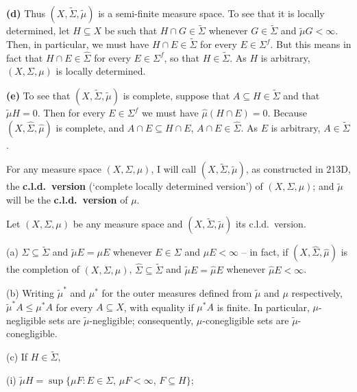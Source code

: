 {\medskip

{\bf (d)} Thus $(X,\tilde\Sigma,\tilde\mu)$ is a semi-finite measure space.
To see that it is locally determined, let $H\subseteq X$ be such that
$H\cap G\in\tilde\Sigma$ whenever $G\in\tilde\Sigma$ and
$\tilde\mu G<\infty$.   Then, in particular, we must have
$H\cap E\in\tilde\Sigma$
for every $E\in\Sigma^f$.   But this means in fact that
$H\cap E\in\hat\Sigma$ for every $E\in\Sigma^f$, so that
$H\in\tilde\Sigma$.
As $H$ is arbitrary, $(X,\Sigma,\mu)$ is locally determined.

\medskip

{\bf (e)} To see that $(X,\tilde\Sigma,\tilde\mu)$ is complete,
suppose that $A\subseteq H\in\tilde\Sigma$ and that $\tilde\mu H=0$.
Then for every $E\in\Sigma^f$ we must have $\hat\mu(H\cap E)=0$.
Because $(X,\hat\Sigma,\hat\mu)$ is complete, and
$A\cap E\subseteq H\cap E$, $A\cap E\in\hat\Sigma$.   As $E$ is
arbitrary, $A\in\tilde\Sigma$.
}%

 For any measure space $(X,\Sigma,\mu)$, I will
call $(X,\tilde\Sigma,\tilde\mu)$, as constructed in 213D, the
{\bf c.l.d.\ version} (`complete locally determined version') of $(X,\Sigma,\mu)$;  and $\tilde\mu$ will be the
{\bf c.l.d.\ version} of $\mu$.

 Let $(X,\Sigma,\mu)$ be any measure space
and $(X,\tilde\Sigma,\tilde\mu)$ its c.l.d.\ version.

(a) $\Sigma\subseteq\tilde\Sigma$ and $\tilde\mu E=\mu E$ whenever
$E\in\Sigma$ and $\mu E<\infty$ -- in fact, if $(X,\hat\Sigma,\hat\mu)$
is the completion of $(X,\Sigma,\mu)$, $\hat\Sigma\subseteq\tilde\Sigma$
and $\tilde\mu E=\hat\mu E$ whenever $\hat\mu E<\infty$.

(b) Writing $\tilde\mu^*$ and $\mu^*$ for the outer measures defined
from $\tilde\mu$ and $\mu$ respectively, $\tilde\mu^*A\le\mu^*A$ for
every $A\subseteq X$, with equality if
$\mu^*A$ is finite.   In particular, $\mu$-negligible sets are
$\tilde\mu$-negligible;   consequently, $\mu$-conegligible sets are
$\tilde\mu$-conegligible.

(c) If $H\in\tilde\Sigma$,

\quad (i) $\tilde\mu H=\sup\{\mu F:E\in\Sigma$, $\mu F<\infty$,
$F\subseteq H\}$;

